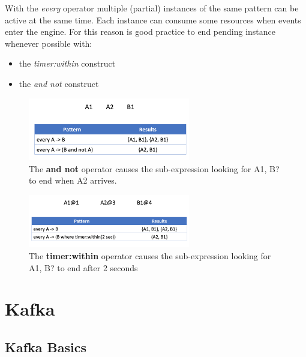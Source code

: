 \documentclass[10pt,a4paper]{article}
\begin{document}
With the \textit{every} operator multiple (partial) instances of the same pattern can be active at the same time. Each instance can consume some resources when events enter the engine. For this reason is good practice to end pending instance whenever possible with:
\begin{itemize}
	\item the \textit{timer:within} construct
	\item the \textit{and not} construct
\end{itemize}
\begin{figure}[ht!]
 \hfill \includegraphics[width=200pt]{images/every-expr1.png}\hspace*{\fill}
 \caption{The \textbf{and not} operator causes the sub-expression looking for {A1, B?} to end when A2 arrives.}
\end{figure} 
\begin{figure}[ht!]
 \hfill \includegraphics[width=200pt]{images/every-expr2.png}\hspace*{\fill}
 \caption{The \textbf{timer:within} operator causes the sub-expression looking for {A1, B?} to end after 2 seconds}
\end{figure} 
\pagebreak
\section{Kafka}
\subsection{Kafka Basics}
\end{document}
